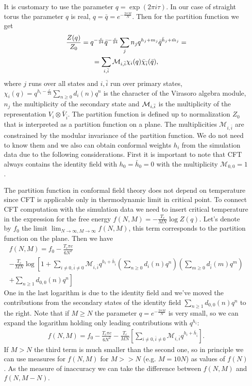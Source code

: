 \documentclass[aps,prl,reprint]{revtex4-1}
\begin{document}
It is customary to use the parameter $q=\exp(2\pi i \tau)$.  In our case of straight torus the parameter $q$ is real, $q=\bar q=e^{-\frac{2\pi M}{N}}$.
Then for the partition function we get
\begin{multline}
  \label{eq:5}
  \frac{Z(q)}{Z_{0}}=q^{-\frac{c}{24}} \bar q^{-\frac{c}{24}}\sum_{j} n_{j} q^{h_{j}+m_{j}}\bar q^{\bar h_{j}+\bar
    m_{j}}=\\=\sum_{i,\bar i} {\cal M}_{i,\bar i}\chi_{i}(q) \bar\chi_{\bar i}(\bar q),
\end{multline}
where $j$ runs over all states and $i, \bar i$ run over primary states,
$\chi_{i}(q)=q^{h_{i}-\frac{c}{24}}\sum_{n\geq 0}d_{i}(n)q^{n}$ is the character of the Virasoro algebra module, $n_{j}$ the multiplicity of
the secondary state and ${\cal M}_{i,\bar i}$ is the multiplicity of the representation $V_{i}\otimes\bar
V_{\bar i}$. The partition function is defined up to normalization $Z_{0}$ that is interpreted as a
partition function on a plane. The multiplicities $\mathcal{M}_{i,\bar i}$ are constrained by  the
modular invariance of the partition function.  We do not need to know them and we also can obtain
conformal weights $h_{i}$ from the simulation data due to the following considerations. First it is important to note that CFT always contains the
identity field with $h_{0}=\bar h_{0}=0$ with the multiplicity $\mathcal{M}_{0,0}=1$.

The partition function in conformal field theory does not depend on temperature since CFT is
applicable only in thermodynamic limit in critical point. To connect CFT computation with the
simulation data we need to insert critical temperature in the expression for the free energy
$  f(N,M)=-\frac{T_{c}}{MN}\log Z(q)$. Let's denote by $f_{0}$ the limit
$\lim_{N\to\infty,M\to\infty}f(N,M)$, this term corresponds to the partition function on the plane.
Then we have
\begin{multline}
  \label{eq:13}
  f(N,M)=f_{0} - \frac{T_{c}\pi c}{6
    N^{2}}\\-\frac{T_{c}}{MN}\log\left[1+\sum_{i\neq 0,\bar i\neq 0} \mathcal{M}_{i,\bar i} q^{h_{i}+\bar h_{\bar
        i}} \left(\sum_{n\geq 0} d_{i}(n) q^{n}\right)\left(\sum_{m\geq 0} d_{\bar i}(m)
      q^{m}\right)\right.\\ +\left.\sum_{n\geq 1}d_{0,0}(n)q^{n}\right]
\end{multline}
One in the last logarithm is due to the identity field and we've moved the  contributions from the  secondary states of
the identity field $\sum_{n\geq 1}d_{0,0}(n)q^{n}$ to the right. Note that if $M\geq N$ the
parameter $q=e^{-\frac{2\pi M}{N}}$ is very small, so we can expand the logarithm holding only
leading contributions with $q^{h_{i}}$:
\begin{multline}
  \label{eq:14}
  f(N,M)=f_{0} - \frac{T_{c}\pi c}{6
    N^{2}}-\frac{T_{c}}{MN}\left[\sum_{i\neq 0,\bar i\neq 0} \mathcal{M}_{i,\bar i} q^{h_{i}+\bar h_{\bar i}} \right].
\end{multline}
If $M>N$ the third term is much smaller than the second one, so in principle we can use measures for
$f(N,M)$ for $M>>N$ (e.g. $M=10 N$) as values of $f(N)$. As the measure of inaccuracy we can take
the difference between $f(N, M)$ and $f(N, M-N)$. 
\end{document}

